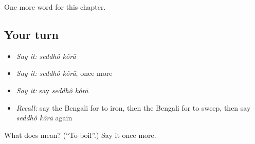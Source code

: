 \begin{grammarlens}[title={What you've built}]
One more word for this chapter.
\end{grammarlens}

\subsection*{Your turn}
\begin{itemize}
\raggedright
  \item \emph{Say it:} \emph{seddhô kôrā}
  \item \emph{Say it:} \emph{seddhô kôrā}, once more
  \item \emph{Say it:} say \emph{seddhô kôrā}
  \item \emph{Recall:} say the Bengali for to iron, then the Bengali for to sweep, then say \emph{seddhô kôrā} again
\end{itemize}

\begin{tcolorbox}[breakable,colback=teal!4,colframe=teal!35!black,title={Before you move on}]
What does   mean? (\textquotedblleft{}To boil\textquotedblright{}.) Say it once more.
\end{tcolorbox}

